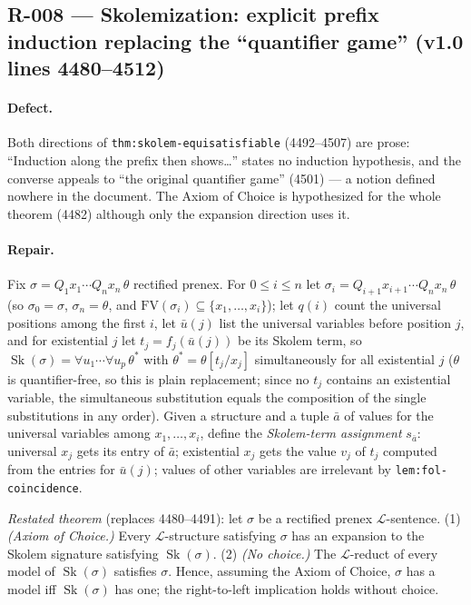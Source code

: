 \subsection*{R-008 --- Skolemization: explicit prefix induction replacing the ``quantifier game'' (v1.0 lines 4480--4512)}

\paragraph{Defect.}
Both directions of \texttt{thm:skolem-equisatisfiable} (4492--4507) are prose:
``Induction along the prefix then shows\ldots'' states no induction hypothesis,
and the converse appeals to ``the original quantifier game'' (4501) --- a notion
defined nowhere in the document.  The Axiom of Choice is hypothesized for the
whole theorem (4482) although only the expansion direction uses it.

\paragraph{Repair.}
Fix \(\sigma=Q_1x_1\cdots Q_nx_n\,\theta\) rectified prenex.  For \(0\le i\le
n\) let \(\sigma_i=Q_{i+1}x_{i+1}\cdots Q_nx_n\,\theta\) (so
\(\sigma_0=\sigma\), \(\sigma_n=\theta\), and
\(\mathrm{FV}(\sigma_i)\subseteq\{x_1,\ldots,x_i\}\)); let \(q(i)\) count the
universal positions among the first \(i\), let \(\bar u(j)\) list the universal
variables before position \(j\), and for existential \(j\) let
\(t_j=f_j(\bar u(j))\) be its Skolem term, so
\(\operatorname{Sk}(\sigma)=\forall u_1\cdots\forall u_p\,\theta^{*}\) with
\(\theta^{*}=\theta[t_j/x_j]\) simultaneously for all existential \(j\)
(\(\theta\) is quantifier-free, so this is plain replacement; since no \(t_j\)
contains an existential variable, the simultaneous substitution equals the
composition of the single substitutions in any order).  Given a structure and a
tuple \(\bar a\) of values for the universal variables among
\(x_1,\ldots,x_i\), define the \emph{Skolem-term assignment} \(s_{\bar a}\):
universal \(x_j\) gets its entry of \(\bar a\); existential \(x_j\) gets the
value \(v_j\) of \(t_j\) computed from the entries for \(\bar u(j)\); values of
other variables are irrelevant by \texttt{lem:fol-coincidence}.

\emph{Restated theorem} (replaces 4480--4491): let \(\sigma\) be a rectified
prenex \(\mathcal{L}\)-sentence.  (1) \emph{(Axiom of Choice.)}  Every
\(\mathcal{L}\)-structure satisfying \(\sigma\) has an expansion to the Skolem
signature satisfying \(\operatorname{Sk}(\sigma)\).  (2) \emph{(No choice.)}
The \(\mathcal{L}\)-reduct of every model of \(\operatorname{Sk}(\sigma)\)
satisfies \(\sigma\).  Hence, assuming the Axiom of Choice, \(\sigma\) has a
model iff \(\operatorname{Sk}(\sigma)\) has one; the right-to-left implication
holds without choice.

